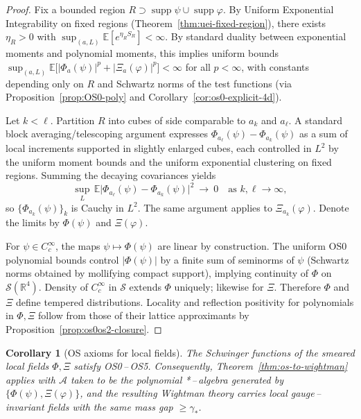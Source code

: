 \documentclass[11pt]{amsart}
\theoremstyle{plain}
\newtheorem{corollary}[theorem]{Corollary}
\theoremstyle{definition}
\theoremstyle{remark}
\begin{document}
\begin{proof}
Fix a bounded region $R\supset \operatorname{supp}\psi\cup\operatorname{supp}\varphi$. By Uniform Exponential Integrability on fixed regions (Theorem~\ref{thm:uei-fixed-region}), there exists $\eta_R>0$ with $\sup_{(a,L)} \mathbb E[e^{\eta_R S_R}]<\infty$. By standard duality between exponential moments and polynomial moments, this implies uniform bounds $\sup_{(a,L)}\mathbb E\big[|\Phi_a(\psi)|^p+|\Xi_a(\varphi)|^p\big]<\infty$ for all $p<\infty$, with constants depending only on $R$ and Schwartz norms of the test functions (via Proposition~\ref{prop:OS0-poly} and Corollary~\ref{cor:os0-explicit-4d}).

Let $k<\ell$. Partition $R$ into cubes of side comparable to $a_k$ and $a_\ell$. A standard block averaging/telescoping argument expresses $\Phi_{a_\ell}(\psi)-\Phi_{a_k}(\psi)$ as a sum of local increments supported in slightly enlarged cubes, each controlled in $L^2$ by the uniform moment bounds and the uniform exponential clustering on fixed regions. Summing the decaying covariances yields
\[
  \sup_L\,\mathbb E\big|\Phi_{a_\ell}(\psi)-\Phi_{a_k}(\psi)\big|^2\ \longrightarrow\ 0\quad \text{as }k,\ell\to\infty,
\]
so $\{\Phi_{a_k}(\psi)\}_k$ is Cauchy in $L^2$. The same argument applies to $\Xi_{a_k}(\varphi)$. Denote the limits by $\Phi(\psi)$ and $\Xi(\varphi)$.

For $\psi\in C_c^\infty$, the maps $\psi\mapsto \Phi(\psi)$ are linear by construction. The uniform OS0 polynomial bounds control $|\Phi(\psi)|$ by a finite sum of seminorms of $\psi$ (Schwartz norms obtained by mollifying compact support), implying continuity of $\Phi$ on $\mathcal S(\mathbb R^4)$. Density of $C_c^\infty$ in $\mathcal S$ extends $\Phi$ uniquely; likewise for $\Xi$. Therefore $\Phi$ and $\Xi$ define tempered distributions. Locality and reflection positivity for polynomials in $\Phi,\Xi$ follow from those of their lattice approximants by Proposition~\ref{prop:os0os2-closure}.
\end{proof}

\begin{corollary}[OS axioms for local fields]
\label{cor:os-local-fields}
The Schwinger functions of the smeared local fields $\Phi,\Xi$ satisfy OS0\,–\,OS5. Consequently, Theorem~\ref{thm:os-to-wightman} applies with $\mathcal A$ taken to be the polynomial *\,–\,algebra generated by $\{\Phi(\psi),\Xi(\varphi)\}$, and the resulting Wightman theory carries local gauge\,–\,invariant fields with the same mass gap $\ge \gamma_*$.
\end{corollary}
\end{document}
